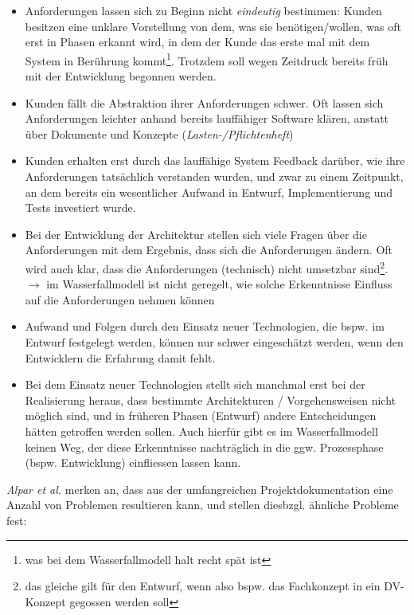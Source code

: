 \begin{itemize}
    \item Anforderungen lassen sich zu Beginn nicht \textit{eindeutig} bestimmen: Kunden besitzen eine unklare Vorstellung von dem, was sie benötigen/wollen, was oft erst in Phasen erkannt wird, in dem der Kunde das erste mal mit dem System in Berührung kommt\footnote{
    was bei dem Wasserfallmodell halt recht spät ist
    }.
    Trotzdem soll wegen Zeitdruck bereits früh mit der Entwicklung begonnen werden.
    \item Kunden fällt die Abstraktion ihrer Anforderungen schwer.
    Oft lassen sich Anforderungen leichter anhand bereits lauffähiger Software klären, anstatt über Dokumente und Konzepte (\textit{Lasten-/Pflichtenheft})
    \item Kunden erhalten erst durch das lauffähige System Feedback darüber, wie ihre Anforderungen tatsächlich verstanden wurden, und zwar zu einem Zeitpunkt, an dem bereits ein wesentlicher Aufwand in Entwurf, Implementierung und Tests investiert wurde.
    \item Bei der Entwicklung der Architektur stellen sich viele Fragen über die Anforderungen mit dem Ergebnis, dass sich die Anforderungen ändern.
    Oft wird auch klar, dass die Anforderungen (technisch) nicht umsetzbar sind\footnote{
     das gleiche gilt für den Entwurf, wenn also bspw. das Fachkonzept in ein DV-Konzept gegossen werden soll
    }.
    $\rightarrow$ im Wasserfallmodell ist nicht geregelt, wie solche Erkenntnisse Einfluss auf die Anforderungen nehmen können
    \item Aufwand und Folgen durch den Einsatz neuer Technologien, die bspw. im Entwurf festgelegt werden, können nur schwer eingeschätzt werden, wenn den Entwicklern die Erfahrung damit fehlt.
    \item Bei dem Einsatz neuer Technologien stellt sich manchmal erst bei der Realisierung heraus, dass bestimmte Architekturen / Vorgehensweisen nicht möglich sind, und in früheren Phasen (Entwurf) andere Entscheidungen hätten getroffen werden sollen.
    Auch hierfür gibt es im Wasserfallmodell keinen Weg, der diese Erkenntnisse nachträglich in die ggw. Prozessphase (bspw. Entwicklung) einfliessen lassen kann.
\end{itemize}

\noindent
\textit{Alpar et al.} merken an, dass aus der umfangreichen Projektdokumentation eine Anzahl von Problemen resultieren kann, und stellen diesbzgl. ähnliche Probleme fest:

